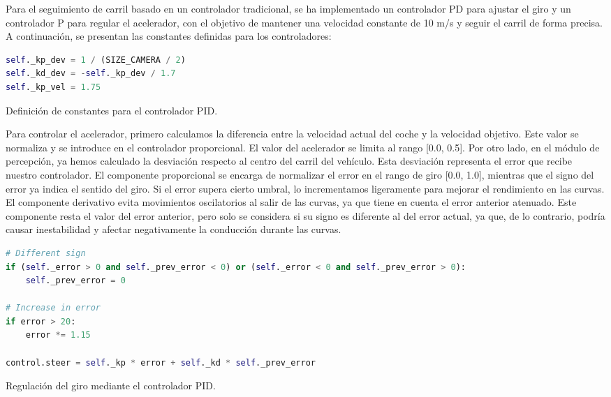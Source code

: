 Para el seguimiento de carril basado en un controlador tradicional, se ha implementado un controlador PD para ajustar el giro y un controlador P para regular el acelerador, con el objetivo de mantener una velocidad constante de 10 m/s y seguir el carril de forma precisa. A continuación, se presentan las constantes definidas para los controladores:
\begin{code}[h]
\begin{lstlisting}[language=Python]
self._kp_dev = 1 / (SIZE_CAMERA / 2)
self._kd_dev = -self._kp_dev / 1.7
self._kp_vel = 1.75
\end{lstlisting}
\caption[Definición de constantes para el controlador \ac{PID}]{Definición de constantes para el controlador \ac{PID}.}
\label{cod:const_pid}
\end{code}

Para controlar el acelerador, primero calculamos la diferencia entre la velocidad actual del coche y la velocidad objetivo. Este valor se normaliza y se introduce en el controlador proporcional. El valor del acelerador se limita al rango [0.0, 0.5]. Por otro lado, en el módulo de percepción, ya hemos calculado la desviación respecto al centro del carril del vehículo. Esta desviación representa el error que recibe nuestro controlador. El componente proporcional se encarga de normalizar el error en el rango de giro [0.0, 1.0], mientras que el signo del error ya indica el sentido del giro. Si el error supera cierto umbral, lo incrementamos ligeramente para mejorar el rendimiento en las curvas. El componente derivativo evita movimientos oscilatorios al salir de las curvas, ya que tiene en cuenta el error anterior atenuado. Este componente resta el valor del error anterior, pero solo se considera si su signo es diferente al del error actual, ya que, de lo contrario, podría causar inestabilidad y afectar negativamente la conducción durante las curvas.

\begin{code}[h]
\begin{lstlisting}[language=Python]
# Different sign
if (self._error > 0 and self._prev_error < 0) or (self._error < 0 and self._prev_error > 0):
    self._prev_error = 0       

# Increase in error
if error > 20:
    error *= 1.15

control.steer = self._kp * error + self._kd * self._prev_error
\end{lstlisting}
\caption[Regulación del giro mediante el controlador \ac{PID}]{Regulación del giro mediante el controlador \ac{PID}.}
\label{cod:pid_giro}
\end{code}

